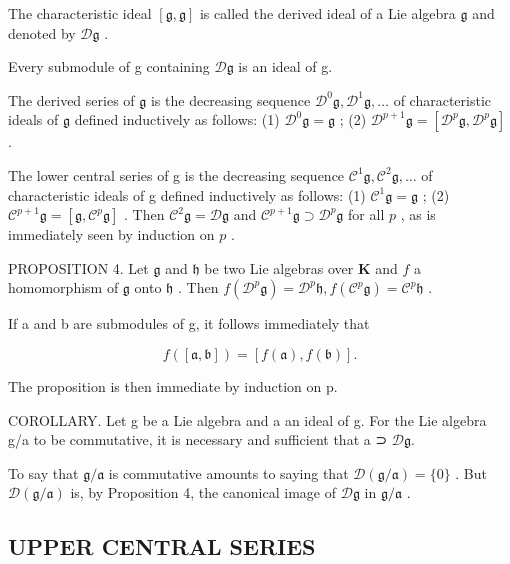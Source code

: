 The characteristic ideal \([\mathfrak{g},\mathfrak{g}]\) is called the derived ideal of a Lie algebra \(\mathfrak{g}\) and denoted by \(\mathcal{D}\mathfrak{g}\) .

Every submodule of g containing \(\mathcal{D}\mathfrak{g}\) is an ideal of g.

The derived series of \(\mathfrak{g}\) is the decreasing sequence \(\mathcal{D}^0\mathfrak{g},\mathcal{D}^1\mathfrak{g},\ldots\) of characteristic ideals of \(\mathfrak{g}\) defined inductively as follows: (1) \(\mathcal{D}^0\mathfrak{g} = \mathfrak{g}\) ; (2) \(\mathcal{D}^{p + 1}\mathfrak{g} = [\mathcal{D}^p\mathfrak{g},\mathcal{D}^p\mathfrak{g}]\) .

The lower central series of g is the decreasing sequence \(\mathcal{C}^1\mathfrak{g},\mathcal{C}^2\mathfrak{g},\ldots\) of characteristic ideals of g defined inductively as follows: (1) \(\mathcal{C}^1\mathfrak{g} = \mathfrak{g}\) ; (2) \(\mathcal{C}^{p + 1}\mathfrak{g} = [\mathfrak{g},\mathcal{C}^p\mathfrak{g}]\) . Then \(\mathcal{C}^2\mathfrak{g} = \mathcal{D}\mathfrak{g}\) and \(\mathcal{C}^{p + 1}\mathfrak{g}\supset \mathcal{D}^{p}\mathfrak{g}\) for all \(p\) , as is immediately seen by induction on \(p\) .

PROPOSITION 4. Let \(\mathfrak{g}\) and \(\mathfrak{h}\) be two Lie algebras over \(\mathbf{K}\) and \(f\) a homomorphism of \(\mathfrak{g}\) onto \(\mathfrak{h}\) . Then \(f(\mathcal{D}^p\mathfrak{g}) = \mathcal{D}^{p}\mathfrak{h}, f(\mathcal{C}^p\mathfrak{g}) = \mathcal{C}^{p}\mathfrak{h}\) .

If a and b are submodules of g, it follows immediately that

\[
f ([ \mathfrak {a}, \mathfrak {b} ]) = [ f (\mathfrak {a}), f (\mathfrak {b}) ].
\]

The proposition is then immediate by induction on p.

COROLLARY. Let g be a Lie algebra and a an ideal of g. For the Lie algebra g/a to be commutative, it is necessary and sufficient that a ⊃ \(\mathcal{D}\mathfrak{g}\).

To say that \(\mathfrak{g} / \mathfrak{a}\) is commutative amounts to saying that \(\mathcal{D}(\mathfrak{g} / \mathfrak{a}) = \{0\}\) . But \(\mathcal{D}(\mathfrak{g} / \mathfrak{a})\) is, by Proposition 4, the canonical image of \(\mathcal{D}\mathfrak{g}\) in \(\mathfrak{g} / \mathfrak{a}\) .

\subsection{UPPER CENTRAL SERIES}


